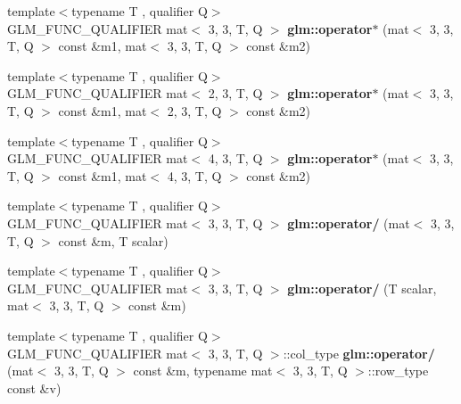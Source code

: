 \begin{DoxyCompactItemize}
\item 
\mbox{\label{type__mat3x3_8inl_ade5fcf5adafcd8d57c6a021c3711b713}} 
{\footnotesize template$<$typename T , qualifier Q$>$ }\\G\+L\+M\+\_\+\+F\+U\+N\+C\+\_\+\+Q\+U\+A\+L\+I\+F\+I\+ER mat$<$ 3, 3, T, Q $>$ {\bfseries glm\+::operator$\ast$} (mat$<$ 3, 3, T, Q $>$ const \&m1, mat$<$ 3, 3, T, Q $>$ const \&m2)
\item 
\mbox{\label{type__mat3x3_8inl_a3ed3940c34380e4dc5ed3a717d09cd19}} 
{\footnotesize template$<$typename T , qualifier Q$>$ }\\G\+L\+M\+\_\+\+F\+U\+N\+C\+\_\+\+Q\+U\+A\+L\+I\+F\+I\+ER mat$<$ 2, 3, T, Q $>$ {\bfseries glm\+::operator$\ast$} (mat$<$ 3, 3, T, Q $>$ const \&m1, mat$<$ 2, 3, T, Q $>$ const \&m2)
\item 
\mbox{\label{type__mat3x3_8inl_a994c9e059f37468648c2390d90b8c4dd}} 
{\footnotesize template$<$typename T , qualifier Q$>$ }\\G\+L\+M\+\_\+\+F\+U\+N\+C\+\_\+\+Q\+U\+A\+L\+I\+F\+I\+ER mat$<$ 4, 3, T, Q $>$ {\bfseries glm\+::operator$\ast$} (mat$<$ 3, 3, T, Q $>$ const \&m1, mat$<$ 4, 3, T, Q $>$ const \&m2)
\item 
\mbox{\label{type__mat3x3_8inl_ad2ca24e662cda5ea986dab9d8c222a7b}} 
{\footnotesize template$<$typename T , qualifier Q$>$ }\\G\+L\+M\+\_\+\+F\+U\+N\+C\+\_\+\+Q\+U\+A\+L\+I\+F\+I\+ER mat$<$ 3, 3, T, Q $>$ {\bfseries glm\+::operator/} (mat$<$ 3, 3, T, Q $>$ const \&m, T scalar)
\item 
\mbox{\label{type__mat3x3_8inl_aeed0637179d40994ce5ae81fa151fcac}} 
{\footnotesize template$<$typename T , qualifier Q$>$ }\\G\+L\+M\+\_\+\+F\+U\+N\+C\+\_\+\+Q\+U\+A\+L\+I\+F\+I\+ER mat$<$ 3, 3, T, Q $>$ {\bfseries glm\+::operator/} (T scalar, mat$<$ 3, 3, T, Q $>$ const \&m)
\item 
\mbox{\label{type__mat3x3_8inl_a96e1564e3a533655fb4b7feddcc2fcd4}} 
{\footnotesize template$<$typename T , qualifier Q$>$ }\\G\+L\+M\+\_\+\+F\+U\+N\+C\+\_\+\+Q\+U\+A\+L\+I\+F\+I\+ER mat$<$ 3, 3, T, Q $>$\+::col\+\_\+type {\bfseries glm\+::operator/} (mat$<$ 3, 3, T, Q $>$ const \&m, typename mat$<$ 3, 3, T, Q $>$\+::row\+\_\+type const \&v)

\end{DoxyCompactItemize}
